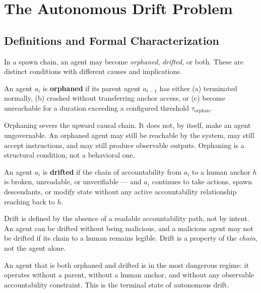 \section{The Autonomous Drift Problem}

\subsection{Definitions and Formal Characterization}

In a spawn chain, an agent may become \emph{orphaned}, \emph{drifted}, or both. These are distinct conditions with different causes and implications.

\begin{definition}
An agent $a_i$ is \textbf{orphaned} if its parent agent $a_{i-1}$ has either (a) terminated normally, (b) crashed without transferring anchor access, or (c) become unreachable for a duration exceeding a configured threshold $\tau_{\text{orphan}}$.
\end{definition}

Orphaning severs the upward causal chain. It does not, by itself, make an agent ungovernable. An orphaned agent may still be reachable by the system, may still accept instructions, and may still produce observable outputs. Orphaning is a structural condition, not a behavioral one.

\begin{definition}
An agent $a_i$ is \textbf{drifted} if the chain of accountability from $a_i$ to a human anchor $h$ is broken, unreadable, or unverifiable --- and $a_i$ continues to take actions, spawn descendants, or modify state without any active accountability relationship reaching back to $h$.
\end{definition}

Drift is defined by the absence of a readable accountability path, not by intent. An agent can be drifted without being malicious, and a malicious agent may not be drifted if its chain to a human remains legible. Drift is a property of the \emph{chain}, not the agent alone.

\begin{definition}
An agent that is both orphaned and drifted is in the most dangerous regime: it operates without a parent, without a human anchor, and without any observable accountability constraint. This is the terminal state of autonomous drift.
\end{definition}

